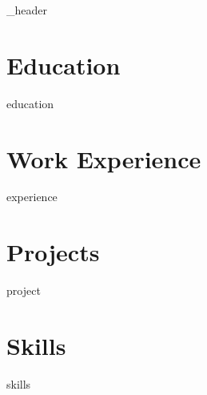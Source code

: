 \documentclass[letter,10pt]{article}
\author{Jialiang Li}
\begin{document}
{_header}
\vspace*{10pt}

\section{Education}
{education}
\vspace*{10pt}

\section{Work Experience}
{experience}
\vspace*{10pt}

\section{Projects}
\vspace*{3pt}
{project}
\vspace*{10pt}

\section{Skills}
\vspace*{3pt}
{skills}
\vspace*{10pt}
\end{document}
